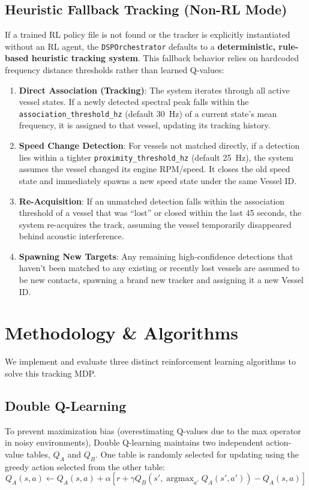 \documentclass[12pt,a4paper]{article}
\begin{document}
\subsection{Heuristic Fallback Tracking (Non-RL Mode)}
If a trained RL policy file is not found or the tracker is explicitly instantiated without an RL agent, the \texttt{DSPOrchestrator} defaults to a \textbf{deterministic, rule-based heuristic tracking system}. This fallback behavior relies on hardcoded frequency distance thresholds rather than learned Q-values:
\begin{enumerate}
    \item \textbf{Direct Association (Tracking)}: The system iterates through all active vessel states. If a newly detected spectral peak falls within the \texttt{association\_threshold\_hz} (default 30~Hz) of a current state's mean frequency, it is assigned to that vessel, updating its tracking history.
    \item \textbf{Speed Change Detection}: For vessels not matched directly, if a detection lies within a tighter \texttt{proximity\_threshold\_hz} (default 25~Hz), the system assumes the vessel changed its engine RPM/speed. It closes the old speed state and immediately spawns a new speed state under the same Vessel ID.
    \item \textbf{Re-Acquisition}: If an unmatched detection falls within the association threshold of a vessel that was ``lost'' or closed within the last 45 seconds, the system re-acquires the track, assuming the vessel temporarily disappeared behind acoustic interference.
    \item \textbf{Spawning New Targets}: Any remaining high-confidence detections that haven't been matched to any existing or recently lost vessels are assumed to be new contacts, spawning a brand new tracker and assigning it a new Vessel ID.
\end{enumerate}

\section{Methodology \& Algorithms}
We implement and evaluate three distinct reinforcement learning algorithms to solve this tracking MDP.

\subsection{Double Q-Learning}
To prevent maximization bias (overestimating Q-values due to the max operator in noisy environments), Double Q-learning maintains two independent action-value tables, $Q_A$ and $Q_B$. One table is randomly selected for updating using the greedy action selected from the other table:
\begin{equation}
    Q_A(s, a) \leftarrow Q_A(s, a) + \alpha \left[ r + \gamma Q_B\left(s', \operatorname{argmax}_{a'} Q_A(s', a')\right) - Q_A(s, a) \right]
\end{equation}
\end{document}

